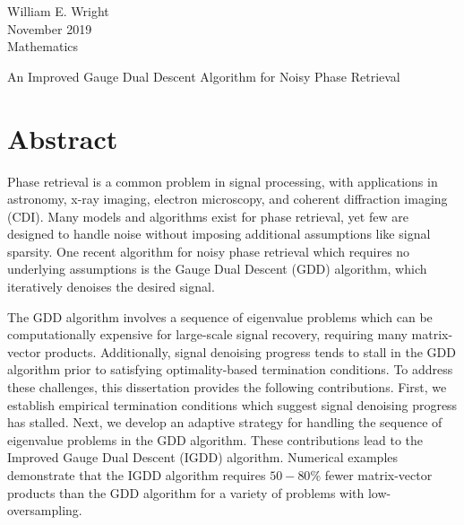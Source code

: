\documentclass{amsart}
\begin{document}
{
   \begin{flushright}
      William E. Wright \\
      November 2019 \\
      Mathematics \\
   \end{flushright}
}

\bigskip

\begin{center}
   An Improved Gauge Dual Descent Algorithm for Noisy Phase Retrieval \\
\end{center}

\section*{Abstract}

\onehalfspacing

Phase retrieval is a common problem in signal processing, with applications in astronomy, x-ray imaging, electron microscopy, and coherent diffraction imaging (CDI).
Many models and algorithms exist for phase retrieval,
yet few are designed to handle noise without imposing additional assumptions like signal sparsity.  
One recent algorithm for noisy phase retrieval which requires no underlying assumptions is the Gauge Dual Descent (GDD) algorithm, which iteratively denoises the desired signal.

The GDD algorithm involves a sequence of eigenvalue problems which can be computationally expensive for large-scale signal recovery, requiring many matrix-vector products.
Additionally, signal denoising progress tends to stall in the GDD algorithm prior to satisfying optimality-based termination conditions.
To address these challenges, this dissertation provides the following contributions.
First, we establish empirical termination conditions which suggest signal denoising progress has stalled.
Next, we develop an adaptive strategy for handling the sequence of eigenvalue problems in the GDD algorithm.
These contributions lead to the Improved Gauge Dual Descent (IGDD) algorithm.
Numerical examples demonstrate that the IGDD algorithm requires $50-80\%$ fewer matrix-vector products than the GDD algorithm for a variety of problems with low-oversampling.
\end{document}
